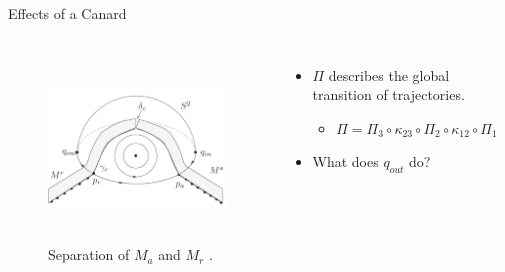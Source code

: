 \documentclass[11pt]{beamer}
\begin{document}
\begin{frame}{Effects of a Canard}
\begin{columns}
\begin{figure}
    
\includegraphics[height=5cm,width=7cm]{Images/Separation}
    \caption{Separation of $ M_a $ and $ M_r $ \citep{Kuehn}.}

\end{figure}
\begin{itemize}
\item $\Pi$ describes the global transition of trajectories.
\begin{itemize}
    \item $\Pi=\Pi_3\circ\kappa_{23}\circ\Pi_2\circ\kappa_{12}\circ\Pi_1$
\end{itemize}
\item What does $q_{out}$ do?
\end{itemize}
\end{columns}
\end{frame}
\end{document}
